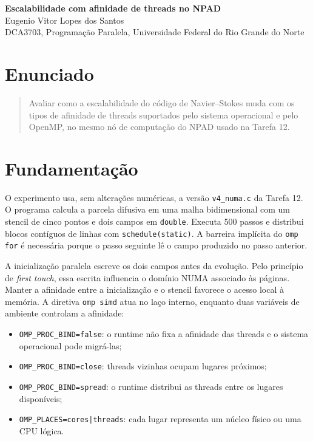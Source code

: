\documentclass[11pt,letterpaper]{article}
\begin{document}
\pagestyle{plain}

\begin{center}
{\LARGE\bfseries Escalabilidade com afinidade de threads no NPAD}\\[0.4em]
{\normalsize Eugenio Vitor Lopes dos Santos}\\[0.3em]
{\small DCA3703, Programação Paralela, Universidade Federal do Rio Grande do Norte}
\end{center}

\section{Enunciado}
\begin{quote}
Avaliar como a escalabilidade do código de Navier--Stokes muda com os tipos de afinidade de threads suportados pelo sistema operacional e pelo OpenMP, no mesmo nó de computação do NPAD usado na Tarefa 12.
\end{quote}

\section{Fundamentação}
O experimento usa, sem alterações numéricas, a versão \texttt{v4\_numa.c} da Tarefa 12. O programa calcula a parcela difusiva em uma malha bidimensional com um stencil de cinco pontos e dois campos em \texttt{double}. Executa 500 passos e distribui blocos contíguos de linhas com \texttt{schedule(static)}. A barreira implícita do \texttt{omp for} é necessária porque o passo seguinte lê o campo produzido no passo anterior.

A inicialização paralela escreve os dois campos antes da evolução. Pelo princípio de \textit{first touch}, essa escrita influencia o domínio NUMA associado às páginas. Manter a afinidade entre a inicialização e o stencil favorece o acesso local à memória. A diretiva \texttt{omp simd} atua no laço interno, enquanto duas variáveis de ambiente controlam a afinidade:

\begin{itemize}
\item \texttt{OMP\_PROC\_BIND=false}: o runtime não fixa a afinidade das threads e o sistema operacional pode migrá-las;
\item \texttt{OMP\_PROC\_BIND=close}: threads vizinhas ocupam lugares próximos;
\item \texttt{OMP\_PROC\_BIND=spread}: o runtime distribui as threads entre os lugares disponíveis;
\item \texttt{OMP\_PLACES=cores|threads}: cada lugar representa um núcleo físico ou uma CPU lógica.
\end{itemize}
\end{document}
